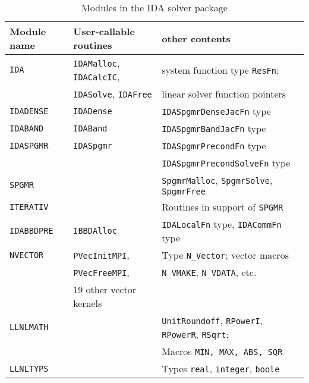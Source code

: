 \begin{table}[htb]
\begin{center}
\begin{tabular}{|l|l|l|} \hline
Module name & User-callable routines & other contents \\ \hline \hline
{\tt IDA}      & {\tt IDAMalloc}, {\tt IDACalcIC}, 
                                 & system function type {\tt ResFn}; \\
               & {\tt IDASolve}, {\tt IDAFree}  
                                 & linear solver function pointers \\
                                                                 \hline\hline

{\tt IDADENSE} &  {\tt IDADense} &  {\tt IDASpgmrDenseJacFn} type \\
                                                                 \hline\hline

{\tt IDABAND}  &  {\tt IDABand} &  {\tt IDASpgmrBandJacFn} type \\
                                                                 \hline\hline

{\tt IDASPGMR} &  {\tt IDASpgmr} &  {\tt IDASpgmrPrecondFn} type \\
               &              &  {\tt IDASpgmrPrecondSolveFn} type \\ \hline
{\tt SPGMR}    & & {\tt SpgmrMalloc}, {\tt SpgmrSolve}, {\tt SpgmrFree} \\ \hline
{\tt ITERATIV} & & Routines in support of {\tt SPGMR} \\
                                                                 \hline\hline

{\tt IDABBDPRE}&  {\tt IBBDAlloc} & {\tt IDALocalFn} type, {\tt IDACommFn} type \\
                                                                 \hline\hline

{\tt NVECTOR}  & {\tt PVecInitMPI},  & Type {\tt N\_Vector}; vector macros \\
               & {\tt PVecFreeMPI},  & {\tt N\_VMAKE}, {\tt N\_VDATA}, etc. \\
               & 19 other vector kernels   & \\ \hline
{\tt LLNLMATH} & & {\tt UnitRoundoff}, {\tt RPowerI}, {\tt RPowerR}, {\tt RSqrt}; \\
               & & Macros {\tt MIN, MAX, ABS, SQR} \\ \hline
{\tt LLNLTYPS} & & Types {\tt real}, {\tt integer}, {\tt boole} \\ \hline

\end{tabular}
\vspace{0.1 in}
\caption{Modules in the IDA solver package}
\label{IDAmodules}
\end{center}
\end{table}


